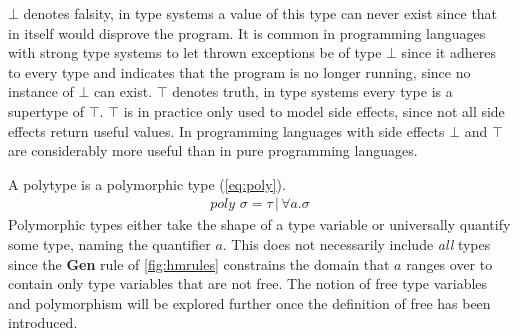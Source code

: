\documentclass[11pt,oneside,a4paper]{report}
\begin{document}
$\bot$ denotes falsity, in type systems a value of this type can never exist since that in itself would disprove the program.
It is common in programming languages with strong type systems to let thrown exceptions be of type $\bot$ since it adheres to every type and indicates that the program is no longer running, since no instance of $\bot$ can exist.
$\top$ denotes truth, in type systems every type is a supertype of $\top$.
$\top$ is in practice only used to model side effects, since not all side effects return useful values.
In programming languages with side effects $\bot$ and $\top$ are considerably more useful than in pure programming languages.

A polytype is a polymorphic type (\autoref{eq:poly}).
\begin{align}
	poly \,\, \sigma = \tau \,|\, \forall a . \sigma
	\label{eq:poly}
\end{align}
Polymorphic types either take the shape of a type variable or universally quantify some type, naming the quantifier $a$.
This does not necessarily include \textit{all} types since the \textbf{Gen} rule of \autoref{fig:hmrules} constrains the domain that $a$ ranges over to contain only type variables that are not free.
The notion of free type variables and polymorphism will be explored further once the definition of free has been introduced.
\end{document}
